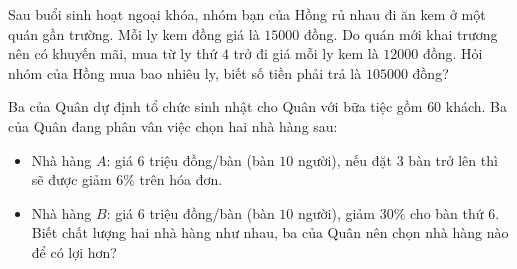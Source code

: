 \begin{bt}%
	Sau buổi sinh hoạt ngoại khóa, nhóm bạn của Hồng rủ nhau đi ăn kem ở một quán gần trường. Mỗi ly kem đồng giá là $ 15000 $ đồng. Do quán mới khai trương nên có khuyến mãi, mua từ ly thứ $ 4 $ trở đi giá mỗi ly kem là $ 12000 $ đồng. Hỏi nhóm của Hồng mua bao nhiêu ly, biết số tiền phải trả là $ 105000 $ đồng?	
\end{bt}

\begin{bt}%
Ba của Quân dự định tổ chức sinh nhật cho Quân với bữa tiệc gồm $60$ khách. Ba của Quân đang phân vân việc chọn hai nhà hàng sau:
\begin{itemize}
\item Nhà hàng $A$: giá $6$ triệu đồng/bàn (bàn $10$ người), nếu đặt $3$ bàn trở lên thì sẽ được giảm $6\%$ trên hóa đơn.
\item Nhà hàng $B$: giá $6$ triệu đồng/bàn (bàn $10$ người), giảm $30\%$ cho bàn thứ $6$.
Biết chất lượng hai nhà hàng như nhau, ba của Quân nên chọn nhà hàng nào để có lợi hơn?
\end{itemize}
\end{bt}

